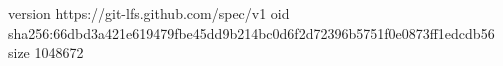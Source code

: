 version https://git-lfs.github.com/spec/v1
oid sha256:66dbd3a421e619479fbe45dd9b214bc0d6f2d72396b5751f0e0873ff1edcdb56
size 1048672
